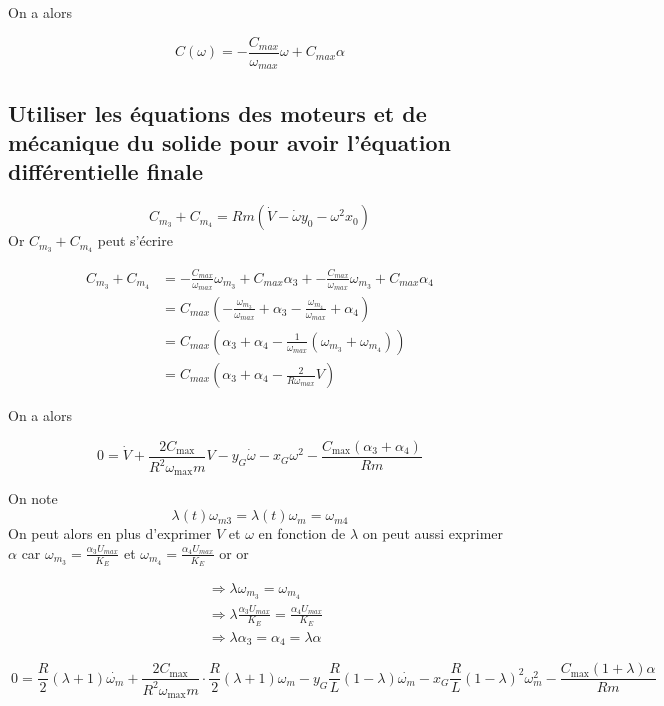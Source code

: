 \documentclass[a4paper,12pt]{report}  %
\begin{document}
On a alors

$$
C(\omega) = -\frac{C_{max}}{\omega_{max}}\omega + C_{max}\alpha 
$$

\subsection{Utiliser les équations des moteurs et de mécanique du solide pour avoir l'équation différentielle finale} 


$$
C_{m_3} + C_{m_4} = Rm(\dot{V} - \dot{\omega} y_0 - \omega^2 x_0)
$$
Or $C_{m_3} + C_{m_4}$ peut s'écrire

\begin{align*}
	C_{m_3} + C_{m_4} &= -\frac{C_{max}}{\omega_{max}}\omega_{m_3} + C_{max}\alpha_3 + -\frac{C_{max}}{\omega_{max}}\omega_{m_3} + C_{max}\alpha_4    \\
	&= C_{max}(-\frac{\omega_{m_3}}{\omega_{max}} + \alpha_3  -\frac{\omega_{m_4}}{\omega_{max}} + \alpha_4)    \\
	&= C_{max}(\alpha_3 + \alpha_4 -\frac{1}{\omega_{max}}(\omega_{m_3} + \omega_{m_4}))    \\
	&= C_{max}(\alpha_3 + \alpha_4 -\frac{2}{R\omega_{max}}V)
\end{align*}

On a alors

$$
\ 0 = \dot{V} + \frac{2 C_{\text{max}}}{R^2 \omega_{\text{max}} m} V - y_G \dot{\omega} - x_G \omega^2 - \frac{C_{\text{max}} (\alpha_3 + \alpha_4)}{R m} \
$$

On note
$$
\lambda (t){\omega}_{m3} = \lambda(t) {\omega_{m}} = \omega_{m4} 
$$
On peut alors en plus d'exprimer $V$ et $\omega$ en fonction de $\lambda$ on peut aussi exprimer $\alpha$ 
car $\omega_{m_3} = \frac{\alpha_3 U_{max}}{K_E}$  et  $\omega_{m_4} = \frac{\alpha_4 U_{max}}{K_E}$ or 
or 

\begin{align*}
	&\Rightarrow \lambda \omega_{m_3} = \omega_{m_4}
	\\
	&\Rightarrow \lambda\frac{\alpha_3 U_{max}}{K_E}=\frac{\alpha_4 U_{max}}{K_E}
	\\
	&\Rightarrow\lambda\alpha_3=\alpha_4 = \lambda\alpha
\end{align*}


$$
\ 0 = \frac{R}{2} (\lambda + 1)\dot{\omega_m} + \frac{2 C_{\text{max}}}{R^2 \omega_{\text{max}} m} \cdot \frac{R}{2} (\lambda + 1)\omega_m - y_G \frac{R}{L} (1 - \lambda)\dot{\omega_m} - x_G \frac{R}{L} (1 - \lambda)^2 \omega_m^2 - \frac{ C_{\text{max}} (1 + \lambda) \alpha}{R m} \
$$
\end{document}
